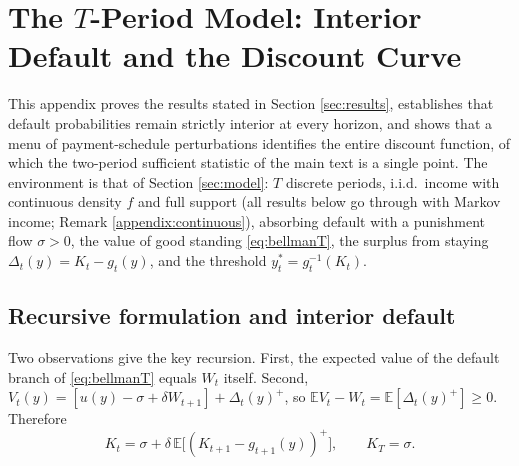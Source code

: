 \documentclass[12pt,english]{article}
\begin{document}
\vfill{}
\thispagestyle{empty}

















\newpage
\singlespace

\newpage


\appendix
\setcounter{table}{0}
\renewcommand{\thetable}{A\arabic{table}}
\setcounter{figure}{0}
\renewcommand{\thefigure}{A\arabic{figure}}

\begin{centering}


\end{centering}

\section{The $T$-Period Model: Interior Default and the Discount Curve}\label{appendix:multiperiod}

This appendix proves the results stated in Section \ref{sec:results}, establishes that default probabilities remain strictly interior at every horizon, and shows that a menu of payment-schedule perturbations identifies the entire discount function, of which the two-period sufficient statistic of the main text is a single point. The environment is that of Section \ref{sec:model}: $T$ discrete periods, i.i.d.\ income with continuous density $f$ and full support (all results below go through with Markov income; Remark \ref{appendix:continuous}), absorbing default with a punishment flow $\sigma > 0$, the value of good standing \eqref{eq:bellmanT}, the surplus from staying $\Delta_t(y) = K_t - g_t(y)$, and the threshold $y_t^* = g_t^{-1}(K_t)$.

\subsection{Recursive formulation and interior default}

Two observations give the key recursion. First, the expected value of the default branch of \eqref{eq:bellmanT} equals $W_t$ itself. Second, $V_t(y) = [u(y) - \sigma + \delta W_{t+1}] + \Delta_t(y)^+$, so $\mathbb{E}V_t - W_t = \mathbb{E}[\Delta_t(y)^+] \ge 0$. Therefore
\begin{equation}\label{eq:Krec}
K_t = \sigma + \delta\, \mathbb{E}\big[(K_{t+1} - g_{t+1}(y))^+\big], \qquad K_T = \sigma.
\end{equation}
\end{document}
